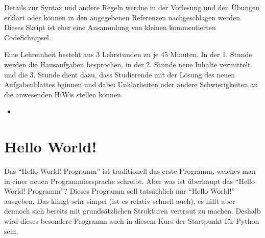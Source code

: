 \documentclass[letterpaper,10pt,english]{jupyterBook}
\begin{document}
\sphinxAtStartPar
{} Details zur Syntax und andere Regeln werdne in der Vorlesung und den Übungen erklärt oder
können in den angegebenen Referenzen nachgeschlagen werden. Dieses Skript ist eher eine Ansammlung von kleinen kommentierten
Code\sphinxhyphen{}Schnipsel.

\begin{DUlineblock}{0em}
\item[] 
\end{DUlineblock}

\sphinxAtStartPar
Eine Lehreinheit besteht aus 3 Lehrstunden zu je 45 Minuten. In der 1. Stunde werden die Hausaufgaben besprochen, in der 2. Stunde
neue Inhalte vermittelt und die 3. Stunde dient dazu, dass Studierende mit der Lösung des neuen Aufgabenblattes bginnen und dabei
Unklarheiten oder andere Schwierigkeiten an die anwesenden HiWis stellen können.
\begin{itemize}
\item {} 
\sphinxAtStartPar
{\hyperref[\detokenize{Notebooks/Hello World!::doc}]{}}

\end{itemize}

\sphinxstepscope


\chapter{Hello World!}
\label{\detokenize{Notebooks/Hello World!:hello-world}}\label{\detokenize{Notebooks/Hello World!::doc}}
\sphinxAtStartPar
Das “Hello World! \sphinxhyphen{} Programm” ist traditionell das erste Programm, welches man in einer neuen Programmiersprache schreibt.
Aber was ist überhaupt das “Hello World! \sphinxhyphen{} Programm”? Dieses Programm soll tatsächlich nur “Hello World!” ausgeben. Das klingt
sehr simpel (ist es relativ schnell auch), es hilft aber dennoch sich bereits mit grundsätzlichen Strukturen vertraut zu machen.
Deshalb wird dieses besondere Programm auch in diesem Kurs der Startpunkt für Python sein.
\end{document}
